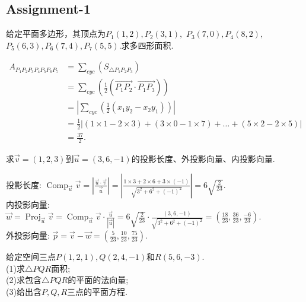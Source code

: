\subsection{Assignment-1}

\begin{problem}{}{}
    给定平面多边形，其顶点为$P_{1}(1,2),P_{2}(3,1),$ $P_{3}(7,0),P_{4}(8,2),$
$P_{5}(6,3),$$P_{6}(7,4),P_{7}(5,5).$求多四形面积.
\end{problem}

\begin{solution}
    \begin{align*}
        A_{P_1P_2P_3P_4P_5P_6P_7} &=\sum_{cyc} (S_{\triangle P_1P_2P_3}) \\
        &= \sum_{cyc} (\frac{1}{2}(\overrightarrow{P_1P_2} \cdot \overrightarrow{P_1P_3} )) \\
        &= |\sum_{cyc} (\frac{1}{2}(x_1y_2-x_2y_1))| \\
        &= \frac{1}{2}|(1 \times 1 - 2 \times 3) + (3 \times 0 - 1 \times 7) + \dots + (5 \times 2 - 2 \times 5)| \\
        &= \frac{37}{2}.
    \end{align*}
\end{solution}

\begin{problem}{}{}
    求$\overrightarrow{v}=(1,2,3)$到$\overrightarrow{u}=(3,6,-1)$的投影长度、外投影向量、内投影向量.
\end{problem}

\begin{solution}
    投影长度: $\displaystyle \operatorname{Comp}_{\overrightarrow{u}} \overrightarrow{v} = |\frac{\overrightarrow{u} \cdot \overrightarrow{v}}{\overrightarrow{u}}| = |\frac{1 \times 3 + 2 \times 6 + 3 \times (-1)}{\sqrt{3^2+6^2+(-1)^2}} |= 6 \sqrt{\frac{2}{23}}.$ \\
    内投影向量: $\overrightarrow{w}=\operatorname{Proj}_{\overrightarrow{u}} \overrightarrow{v} = \displaystyle \operatorname{Comp}_{\overrightarrow{u}} \overrightarrow{v} \cdot \frac{\overrightarrow{u}}{|\overrightarrow{u}|} = 6 \sqrt{\frac{2}{23}} \cdot \frac{(3,6,-1)}{\sqrt{3^2+6^2+(-1)^2}}= (\frac{18}{23},\frac{36}{23},\frac{-6}{23}).$ \\
    外投影向量: $\displaystyle \overrightarrow{p}= \overrightarrow{v} - \overrightarrow{ w} = (\frac{5}{23},\frac{10}{23},\frac{75}{23}).$
\end{solution}


\begin{problem}{}{}
    给定空间三点$P(1,2,1),Q(2,4,-1)$和$R(5,6,-3).$\\
(1)求$\triangle PQR$面积;\\
(2)求包含$\triangle PQR$的平面的法向量;\\
(3)给出含$P,Q,R$三点的平面方程.
\end{problem}

